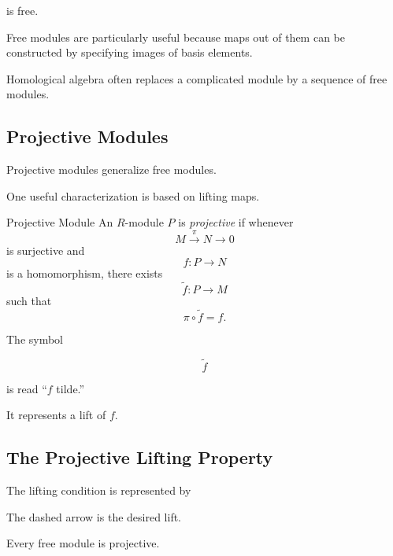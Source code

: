 is free.

Free modules are particularly useful because maps out of them can be
constructed by specifying images of basis elements.

Homological algebra often replaces a complicated module by a sequence of
free modules.

\subsection{Projective Modules}
\label{subsec:projective-modules-homological}

Projective modules generalize free modules.

One useful characterization is based on lifting maps.

\begin{definitionbox}{Projective Module}
An \(R\)-module \(P\) is \emph{projective} if whenever
\[ M\xrightarrow{\pi}N\to0 \]
is surjective and
\[ f:P\to N \]
is a homomorphism, there exists
\[ \widetilde f:P\to M \]
such that
\[ \pi\circ\widetilde f=f. \]
\end{definitionbox}

The symbol

\[ \widetilde f \]

is read ``\(f\) tilde.''

It represents a lift of \(f\).

\subsection{The Projective Lifting Property}
\label{subsec:projective-lifting-visual}

The lifting condition is represented by

\begin{center}
\end{center}

The dashed arrow is the desired lift.

Every free module is projective.

